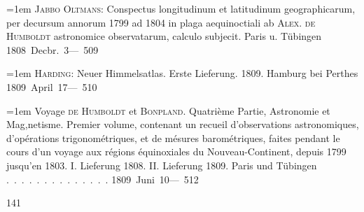 \noindent\hangindent=1em \textsc{Jabbo Oltmans}: Conspectus longitudinum et latitudinum geographicarum, per decursum annorum 1799 ad 1804 in plaga aequinoctiali ab \textsc{Alex. de Humboldt} astronomice observatarum, calculo subjecit. Paris u. Tübingen  \hfill\mbox{1808 Decbr. 3}\quad\mbox{--- 509}\par\smallskip
\noindent\hangindent=1em \textsc{Harding}: Neuer Himmelsatlas. Erste Lieferung. 1809. Hamburg bei Perthes  \hfill\mbox{1809 April 17}\quad\mbox{--- 510}\par\smallskip
\noindent\hangindent=1em Voyage \textsc{de Humboldt} et \textsc{Bonpland}. Quatrième Partie, Astronomie et Mag,netisme. Premier volume, contenant un recueil d'observations astronomiques, d'opérations trigonométriques, et de mésures barométriques, faites pendant le cours d'un voyage aux régions équinoxiales du Nouveau-Continent, depuis 1799 jusqu'en 1803. I. Lieferung 1808. II. Lieferung 1809. Paris und Tübingen \mbox{.\ .\ .\ .\ .\ .\ .\ .\ .\ .\ .\ .\ .\ .} \hfill\mbox{1809 Juni 10}\quad\mbox{--- 512}\par\smallskip
\endgroup
\par\vfill
{}\hfill{\small 141}\hspace*{.18\textwidth}\par
